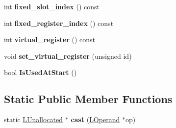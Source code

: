\begin{DoxyCompactItemize}
\item 
\hypertarget{classv8_1_1internal_1_1_l_unallocated_a471c6223bc3c6acdb3946a4d0a4e60e9}{}int {\bfseries fixed\+\_\+slot\+\_\+index} () const \label{classv8_1_1internal_1_1_l_unallocated_a471c6223bc3c6acdb3946a4d0a4e60e9}

\item 
\hypertarget{classv8_1_1internal_1_1_l_unallocated_acfb9b54832a88c3d8c00c74d16b5eb5f}{}int {\bfseries fixed\+\_\+register\+\_\+index} () const \label{classv8_1_1internal_1_1_l_unallocated_acfb9b54832a88c3d8c00c74d16b5eb5f}

\item 
\hypertarget{classv8_1_1internal_1_1_l_unallocated_aed931ce6fac8adfed1f654b707481594}{}int {\bfseries virtual\+\_\+register} () const \label{classv8_1_1internal_1_1_l_unallocated_aed931ce6fac8adfed1f654b707481594}

\item 
\hypertarget{classv8_1_1internal_1_1_l_unallocated_a566b6b30c5379f4223e4d2bb3b78e5b3}{}void {\bfseries set\+\_\+virtual\+\_\+register} (unsigned id)\label{classv8_1_1internal_1_1_l_unallocated_a566b6b30c5379f4223e4d2bb3b78e5b3}

\item 
\hypertarget{classv8_1_1internal_1_1_l_unallocated_ae8f5b965f80d608b35b91df5412d775f}{}bool {\bfseries Is\+Used\+At\+Start} ()\label{classv8_1_1internal_1_1_l_unallocated_ae8f5b965f80d608b35b91df5412d775f}

\end{DoxyCompactItemize}
\subsection*{Static Public Member Functions}
\begin{DoxyCompactItemize}
\item 
\hypertarget{classv8_1_1internal_1_1_l_unallocated_a1e14abbf5d697fe326914134e8eee8a8}{}static \hyperlink{classv8_1_1internal_1_1_l_unallocated}{L\+Unallocated} $\ast$ {\bfseries cast} (\hyperlink{classv8_1_1internal_1_1_l_operand}{L\+Operand} $\ast$op)\label{classv8_1_1internal_1_1_l_unallocated_a1e14abbf5d697fe326914134e8eee8a8}

\end{DoxyCompactItemize}
